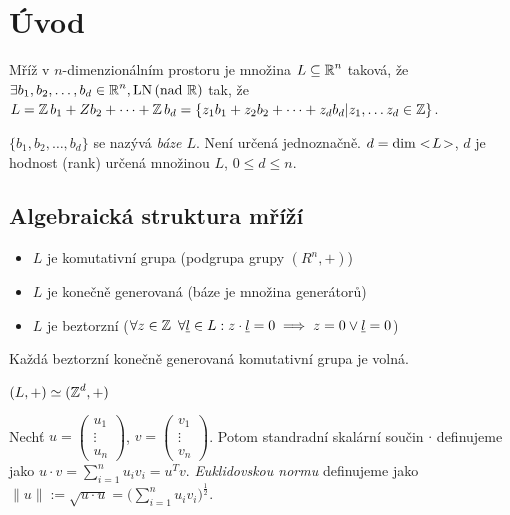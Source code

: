 \section{Úvod}

\begin{definition}
Mříž v $n$-dimenzionálním prostoru je množina $L\subseteq\operatorname{\mathbb{R}}^n$ taková, že $\exists b_1,b_2,\ldots,b_d \in \operatorname{\mathbb{R}}^n, \operatorname{LN} \text{(nad $\operatorname{\mathbb{R}}$)}$ tak, že  $L=\operatorname{\mathbb{Z}} b_1+Z b_2+\cdots+\operatorname{\mathbb{Z}} b_d=\{z_1 b_1 + z_2 b_2 + \cdots + z_d b_d|z_1,\ldots z_d \in \operatorname{\mathbb{Z}}\}$.
\end{definition}

\begin{note}
$\{b_1,b_2,\ldots,b_d \}$ se nazývá \emph{báze $L$}. Není určená jednoznačně. $d=\operatorname{dim}<\!L\!>$, $d$ je hodnost (rank) určená množinou $L$, $0\leq d\leq n$.
\end{note}

\subsection{\texorpdfstring{Algebraická struktura mříží}{Algebraická struktura mrizi}}
\begin{itemize}
    \item $L$ je komutativní grupa (podgrupa grupy $(R^n,+)$)
    \item $L$ je konečně generovaná (báze je množina generátorů)
    \item $L$ je beztorzní ($\forall z\in \operatorname{\mathbb{Z}}\ \forall \underline{l} \in L: z\cdot \underline{l}=0\implies z=0\vee \underline{l}=0$)
\end{itemize} 

\begin{theorem}
Každá beztorzní konečně generovaná komutativní grupa je volná.
\end{theorem}

\begin{consequence}
$(L,+)\simeq (\operatorname{\mathbb{Z}}^d,+)$
\end{consequence}

\begin{definition}
Nechť $u=\begin{pmatrix}
u_1 \\
\vdots \\
u_n
\end{pmatrix}$,
$v=\begin{pmatrix}
v_1 \\
\vdots \\
v_n
\end{pmatrix}$. Potom standradní skalární součin $\cdot$ definujeme jako $u\cdot v= \sum_{i=1}^n u_iv_i=u^Tv$.
\emph{Euklidovskou normu} definujeme jako $\|u\|:=\sqrt{u\cdot u}=\big( \sum_{i=1}^n u_iv_i \big)^{\frac{1}{2}}$.
\end{definition}

